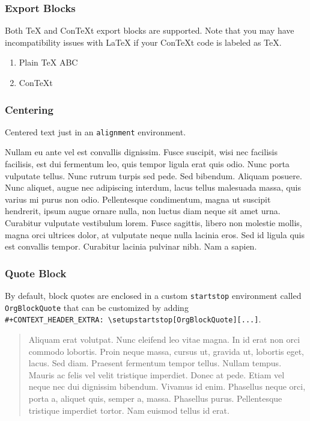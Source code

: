 \documentclass[11pt]{article}
\begin{document}
\subsubsection{Export Blocks}
\label{sec:orgeefb5cd}
Both \TeX{} and ConTeXt export blocks are supported. Note that you may
have incompatibility issues with \LaTeX{} if your ConTeXt code is labeled
as \TeX{}.
\begin{enumerate}
\item Plain \TeX{}
\label{sec:org381da19}
ABC 

\item ConTeXt
\label{sec:org69027f0}
\end{enumerate}
\subsubsection{Centering}
\label{sec:orgf2426c3}
Centered text just in an \texttt{alignment} environment.

\begin{center}
Nullam eu ante vel est convallis dignissim. Fusce suscipit, wisi nec
facilisis facilisis, est dui fermentum leo, quis tempor ligula erat quis
odio. Nunc porta vulputate tellus. Nunc rutrum turpis sed pede. Sed bibendum.
Aliquam posuere. Nunc aliquet, augue nec adipiscing interdum, lacus tellus
malesuada massa, quis varius mi purus non odio. Pellentesque condimentum,
magna ut suscipit hendrerit, ipsum augue ornare nulla, non luctus diam neque
sit amet urna. Curabitur vulputate vestibulum lorem. Fusce sagittis, libero
non molestie mollis, magna orci ultrices dolor, at vulputate neque nulla
lacinia eros. Sed id ligula quis est convallis tempor. Curabitur lacinia
pulvinar nibh. Nam a sapien.
\end{center}
\subsubsection{Quote Block}
\label{sec:org3e8c342}
By default, block quotes are enclosed in a custom \texttt{startstop} environment
called \texttt{OrgBlockQuote} that can be customized by adding\\
\texttt{\#+CONTEXT\_HEADER\_EXTRA: \textbackslash{}setupstartstop[OrgBlockQuote][...]}.

\begin{quote}
Aliquam erat volutpat. Nunc eleifend leo vitae magna. In id erat non orci
commodo lobortis. Proin neque massa, cursus ut, gravida ut, lobortis eget,
lacus. Sed diam. Praesent fermentum tempor tellus. Nullam tempus. Mauris ac
felis vel velit tristique imperdiet. Donec at pede. Etiam vel neque nec dui
dignissim bibendum. Vivamus id enim. Phasellus neque orci, porta a, aliquet
quis, semper a, massa. Phasellus purus. Pellentesque tristique imperdiet
tortor. Nam euismod tellus id erat.
\end{quote}
\end{document}
